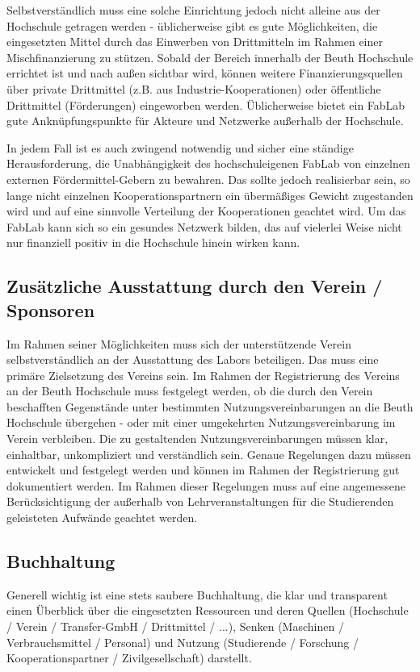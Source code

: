 \documentclass[parskip=half,headsepline,footsepline,titlepage]{scrartcl}
\begin{document}
Selbstverständlich muss eine solche Einrichtung jedoch nicht alleine aus der Hochschule getragen werden - üblicherweise gibt es gute Möglichkeiten, die eingesetzten Mittel durch das Einwerben von Drittmitteln im Rahmen einer Mischfinanzierung zu stützen.
Sobald der Bereich innerhalb der Beuth Hochschule errichtet ist und nach außen sichtbar wird, können weitere Finanzierungsquellen über private Drittmittel (z.B. aus Industrie-Kooperationen) oder öffentliche Drittmittel (Förderungen) eingeworben werden. Üblicherweise bietet ein FabLab gute Anknüpfungspunkte für Akteure und Netzwerke außerhalb der Hochschule.

In jedem Fall ist es auch zwingend notwendig und sicher eine ständige Herausforderung, die Unabhängigkeit des hochschuleigenen FabLab von einzelnen externen Fördermittel-Gebern zu bewahren. Das sollte jedoch realisierbar sein, so lange nicht einzelnen Kooperationspartnern ein übermäßiges Gewicht zugestanden wird und auf eine sinnvolle Verteilung der Kooperationen geachtet wird.
Um das FabLab kann sich so ein gesundes Netzwerk bilden, das auf vielerlei Weise nicht nur finanziell positiv in die Hochschule hinein wirken kann.


\subsection{Zusätzliche Ausstattung durch den Verein / Sponsoren}
Im Rahmen seiner Möglichkeiten muss sich der unterstützende Verein selbstverständlich an der Ausstattung des Labors beteiligen. Das muss eine primäre Zielsetzung des Vereins sein.
Im Rahmen der Registrierung des Vereins an der Beuth Hochschule muss festgelegt werden, ob die durch den Verein beschafften Gegenstände unter bestimmten Nutzungsvereinbarungen an die Beuth Hochschule übergehen - oder mit einer umgekehrten Nutzungsvereinbarung im Verein verbleiben. Die zu gestaltenden Nutzungsvereinbarungen müssen klar, einhaltbar, unkompliziert und verständlich sein.
Genaue Regelungen dazu müssen entwickelt und festgelegt werden und können im Rahmen der Registrierung gut dokumentiert werden. Im Rahmen dieser Regelungen muss auf eine angemessene Berücksichtigung der außerhalb von Lehrveranstaltungen für die Studierenden geleisteten Aufwände geachtet werden.


\subsection{Buchhaltung}
Generell wichtig ist eine stets saubere Buchhaltung, die klar und transparent einen Überblick über die eingesetzten Ressourcen und deren Quellen (Hochschule / Verein / Transfer-GmbH / Drittmittel / ...), Senken (Maschinen / Verbrauchsmittel / Personal) und Nutzung (Studierende / Forschung / Kooperationspartner / Zivilgesellschaft) darstellt.
\end{document}
